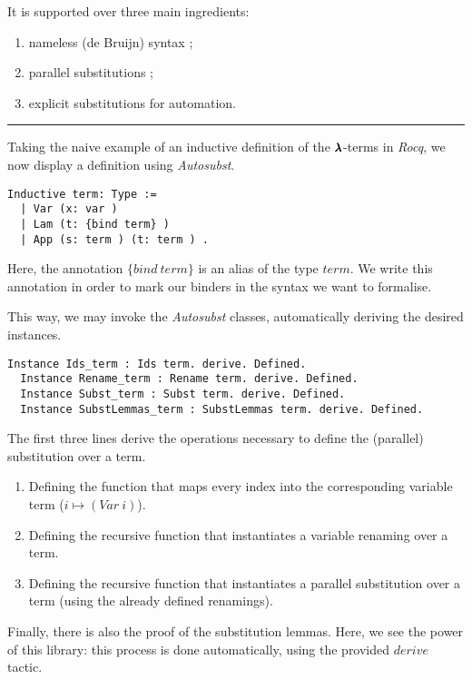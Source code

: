 It is supported over three main ingredients:
\begin{enumerate}
\item nameless (de Bruijn) syntax ;
\item parallel substitutions ;
\item explicit substitutions for automation.
\end{enumerate}

\vspace{2em} \hrule \vspace{2em}

Taking the naive example of an inductive definition of the $\pmb{\lambda}$-terms in \textit{Rocq}, we now display a definition using \textit{Autosubst}.

\begin{lstlisting}[language=Coq]
  Inductive term: Type :=
  | Var (x: var )
  | Lam (t: {bind term} )
  | App (s: term ) (t: term ) .
\end{lstlisting}

Here, the annotation $\{bind \ term\}$ is an alias of the type $term$.
We write this annotation in order to mark our binders in the syntax we want to formalise.  

This way, we may invoke the \textit{Autosubst} classes, automatically deriving the desired instances.

\begin{lstlisting}[language=Coq]
  Instance Ids_term : Ids term. derive. Defined.
  Instance Rename_term : Rename term. derive. Defined.
  Instance Subst_term : Subst term. derive. Defined.
  Instance SubstLemmas_term : SubstLemmas term. derive. Defined.
\end{lstlisting}

The first three lines derive the operations necessary to define the (parallel) substitution over a term.
\begin{enumerate}
\item Defining the function that maps every index into the corresponding variable term ($i \mapsto (Var \ i)$).
\item Defining the recursive function that instantiates a variable renaming over a term.
\item Defining the recursive function that instantiates a parallel substitution over a term (using the already defined renamings).
\end{enumerate}

Finally, there is also the proof of the substitution lemmas. 
Here, we see the power of this library: this process is done automatically, using the provided $derive$ tactic.

